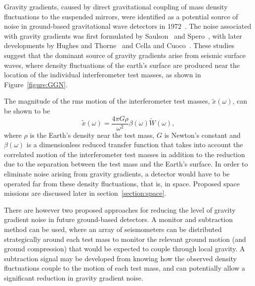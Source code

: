 \documentclass{article}
\begin{document}
Gravity gradients, caused by direct gravitational coupling of mass density
fluctuations to the suspended mirrors, were identified as a potential source of
noise in ground-based gravitational wave detectors in 1972~\cite{Weiss}. The
noise associated with gravity gradients was first formulated by
Saulson~\cite{Saulson1} and Spero~\cite{Spero}, with later developments by
Hughes and Thorne~\cite{Thorne:1998} and Cella and Cuoco~\cite{Beccariay:1998}.
These studies suggest that the dominant source of gravity gradients arise from
seismic surface waves, where density fluctuations of the earth's surface are
produced near the location of the individual interferometer test masses, as
shown in Figure~\ref{figure:GGN}.


The magnitude of the rms motion of the interferometer test masses, 
$\tilde{x}(\omega)$, can be shown to be~\cite{Thorne:1998}
%
\begin{equation}
  \tilde{x}(\omega) = \frac{4 \pi G \rho}{\omega^{2}} \beta(\omega) 
\tilde{W}(\omega),
  \label{equation:GGN}
\end{equation}
%
where $\rho$ is the Earth's density near the test mass, $G$ is Newton's constant
and $\beta(\omega)$ is a dimensionless reduced transfer function that takes into
account the correlated motion of the interferometer test masses in addition to
the reduction due to the separation between the test mass and the Earth's
surface.  In order to eliminate noise arising from gravity gradients, a detector
would have to be operated far from these density fluctuations, that is, in
space.  Proposed space missions are discussed later in
section~\ref{section:space}.

There are however two proposed approaches for reducing the level of gravity 
gradient noise in future ground-based detectors. A monitor and subtraction
method can be used, where an array of seismometers can be distributed
strategically around each test mass to monitor the relevant ground motion (and
ground compression) that would be expected to couple through local gravity.  A
subtraction signal may be developed from knowing how the observed density
fluctuations couple to the motion of each test mass, and can potentially allow a
significant reduction in gravity gradient noise.
\end{document}
